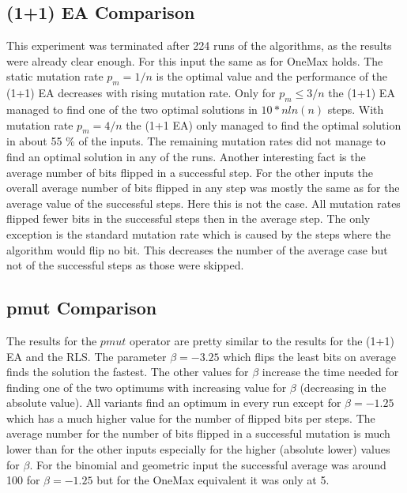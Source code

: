 \subsection{(1+1) EA Comparison}




This experiment was terminated after 224 runs of the algorithms, as the results were already clear enough.
For this input the same as for OneMax holds. 
The static mutation rate $p_m=1/n$ is the optimal value and the performance of the (1+1) EA decreases with rising mutation rate.
Only for $p_m\le3/n$ the (1+1) EA managed to find one of the two optimal solutions in $10*nln(n)$ steps.
With mutation rate $p_m=4/n$ the (1+1 EA) only managed to find the optimal solution in about 55 \% of the inputs.
The remaining mutation rates did not manage to find an optimal solution in any of the runs.
Another interesting fact is the average number of bits flipped in a successful step.
For the other inputs the overall average number of bits flipped in any step was mostly the same as for the average value of the successful steps. Here this is not the case.
All mutation rates flipped fewer bits in the successful steps then in the average step.
The only exception is the standard mutation rate which is caused by the steps where the algorithm would flip no bit.
This decreases the number of the average case but not of the successful steps as those were skipped.
\subsection{pmut Comparison}
The results for the $pmut$ operator are pretty similar to the results for the (1+1) EA and the RLS.
The parameter $\beta=-3.25$ which flips the least bits on average finds the solution the fastest.
The other values for $\beta$ increase the time needed for finding one of the two optimums with increasing value for $\beta$ (decreasing in the absolute value).
All variants find an optimum in every run except for $\beta=-1.25$ which has a much higher value for the number of flipped bits per steps.
The average number for the number of bits flipped in a successful mutation is much lower than for the other inputs especially for the higher (absolute lower) values for $\beta$.
For the binomial and geometric input the successful average was around 100 for $\beta=-1.25$ but for the OneMax equivalent it was only at 5.





